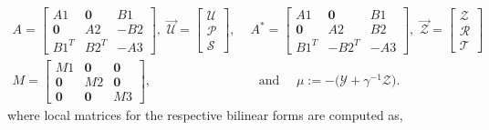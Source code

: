 \documentclass[smallextended]{svjour3}
\numberwithin{equation}{section}
\numberwithin{figure}{section}
\numberwithin{table}{section}
\newcommand\cero{{\boldsymbol{0}}}
\begin{document}
		\begin{equation} \label{compute:localmat}
        \begin{aligned}
		A=	\begin{bmatrix}
				A1 & \cero & B1 \\
				\cero & A2 & -B2 \\
				B1^T & B2^T & -A3
			\end{bmatrix}, \,\,
		\vec{\mathcal{U}}=
			\begin{bmatrix}
				\mathcal{U} \\ 
				\mathcal{P} \\
				\mathcal{S} 
			\end{bmatrix}, &
			\,\,
		A^*=\begin{bmatrix}
				A1 & \cero & B1 \\
				\cero & A2 & B2 \\
				B1^T & -B2^T & -A3
			\end{bmatrix},
			\, \,
		\vec{\mathcal{Z}}=
			\begin{bmatrix}
				\mathcal{Z} \\ 
				\mathcal{R} \\
				\mathcal{T}
			\end{bmatrix} \\
        M=\begin{bmatrix}
				M1 & \cero & \cero \\
				\cero & M2 & \cero \\
				\cero & \cero & M3
			\end{bmatrix}, &
		\quad \text{and } \quad
		{\mu}:= - \big( {\mathcal{Y}} + \gamma^{-1} \mathcal{Z} \big).
        \end{aligned}
		\end{equation}
	where local matrices for the respective bilinear forms are computed as,
\end{document}
